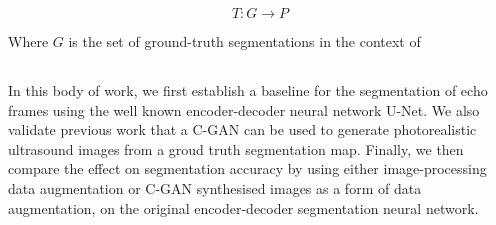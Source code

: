 \begin{equation}
    T:G \rightarrow P
\end{equation} \newline

Where $G$ is the set of ground-truth segmentations in the context of 

\subsection{}

In this body of work, we first establish a baseline for the segmentation of echo
frames using the well known encoder-decoder neural network U-Net. We also
validate previous work that a C-GAN can be used to generate photorealistic
ultrasound images from a groud truth segmentation map. Finally, we then compare
the effect on segmentation accuracy by using either image-processing data augmentation
or C-GAN synthesised images as a form of data augmentation, on the original
encoder-decoder segmentation neural network.